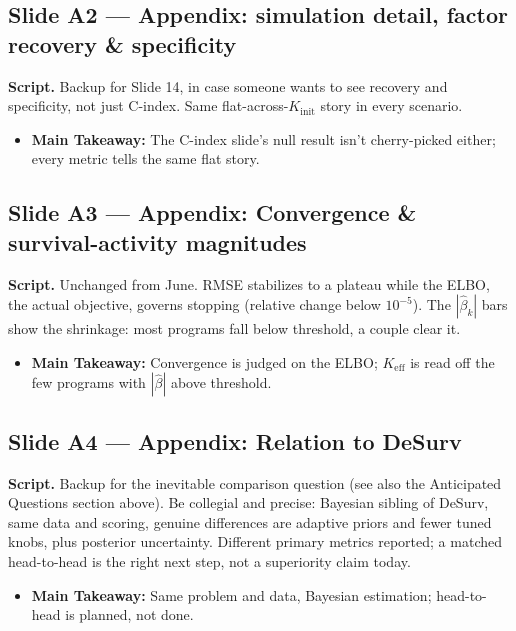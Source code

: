 \documentclass[11pt]{article}
\newcommand{\scriptlabel}{\textbf{Script. }}
\newcommand{\sectionlabel}[1]{\textbf{#1}}
\begin{document}
\subsection*{Slide A2 --- Appendix: simulation detail, factor recovery \& specificity}
\scriptlabel Backup for Slide 14, in case someone wants to see recovery and specificity, not just
C-index. Same flat-across-$K_\text{init}$ story in every scenario.

\begin{itemize}
\item \sectionlabel{Main Takeaway:} The C-index slide's null result isn't cherry-picked either; every
metric tells the same flat story.
\end{itemize}

\subsection*{Slide A3 --- Appendix: Convergence \& survival-activity magnitudes}
\scriptlabel Unchanged from June. RMSE stabilizes to a plateau while the ELBO, the actual objective,
governs stopping (relative change below $10^{-5}$). The $|\hat\beta_k|$ bars show the shrinkage: most
programs fall below threshold, a couple clear it.

\begin{itemize}
\item \sectionlabel{Main Takeaway:} Convergence is judged on the ELBO; $K_\text{eff}$ is read off the
few programs with $|\hat\beta|$ above threshold.
\end{itemize}

\subsection*{Slide A4 --- Appendix: Relation to DeSurv}
\scriptlabel Backup for the inevitable comparison question (see also the Anticipated Questions
section above). Be collegial and precise: Bayesian sibling of DeSurv, same data and scoring, genuine
differences are adaptive priors and fewer tuned knobs, plus posterior uncertainty. Different primary
metrics reported; a matched head-to-head is the right next step, not a superiority claim today.

\begin{itemize}
\item \sectionlabel{Main Takeaway:} Same problem and data, Bayesian estimation; head-to-head is
planned, not done.
\end{itemize}
\end{document}
